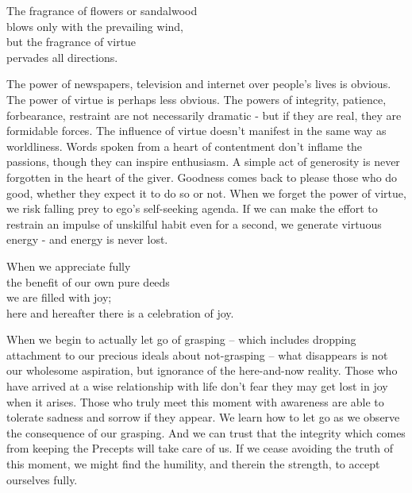 
\begin{dhpVerse}{54}
\label{dhp-54}
The fragrance of flowers or sandalwood\\
blows only with the prevailing wind,\\
but the fragrance of virtue\\
pervades all directions.
\end{dhpVerse}

\begin{dhpRefl}
The power of newspapers, television and internet over people's lives is obvious. The power of virtue is perhaps less obvious. The powers of integrity, patience, forbearance, restraint are not necessarily dramatic - but if they are real, they are formidable forces. The influence of virtue doesn't manifest in the same way as worldliness. Words spoken from a heart of contentment don't inflame the passions, though they can inspire enthusiasm. A simple act of generosity is never forgotten in the heart of the giver. Goodness comes back to please those who do good, whether they expect it to do so or not. When we forget the power of virtue, we risk falling prey to ego's self-seeking agenda. If we can make the effort to restrain an impulse of unskilful habit even for a second, we generate virtuous energy - and energy is never lost.
\end{dhpRefl}


\begin{dhpVerse}{16}
\label{dhp-16}
When we appreciate fully\\
the benefit of our own pure deeds\\
we are filled with joy;\\
here and hereafter there is a celebration of joy.
\end{dhpVerse}

\begin{dhpRefl}
When we begin to actually let go of grasping – which includes dropping attachment to our precious ideals about not-grasping – what disappears is not our wholesome aspiration, but ignorance of the here-and-now reality. Those who have arrived at a wise relationship with life don't fear they may get lost in joy when it arises. Those who truly meet this moment with awareness are able to tolerate sadness and sorrow if they appear. We learn how to let go as we observe the consequence of our grasping. And we can trust that the integrity which comes from keeping the Precepts will take care of us. If we cease avoiding the truth of this moment, we might find the humility, and therein the strength, to accept ourselves fully.
\end{dhpRefl}

